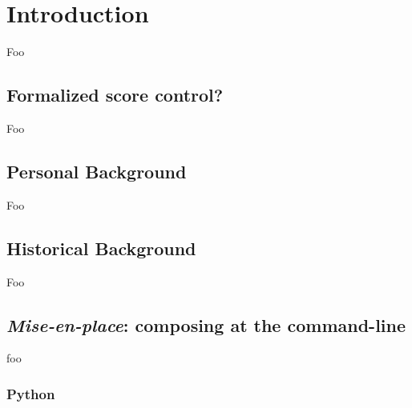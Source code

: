 \chapter{Introduction}
\label{chap:introduction}

Foo

\section{Formalized score control?}

Foo

\section{Personal Background}

Foo

\section{Historical Background}

Foo

\section{\emph{Mise-en-place}: composing at the command-line}

foo

\subsection{Python}

